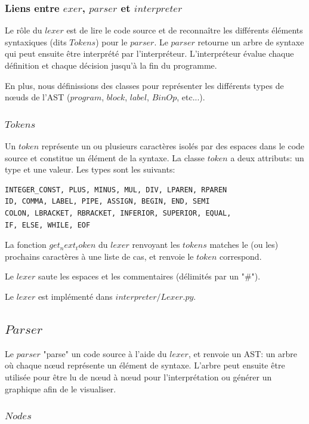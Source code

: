 \documentclass[a4paper]{article}
\begin{document}
\subsubsection{Liens entre $exer$, $parser$ et $interpreter$}

Le rôle du $lexer$ est de lire le code source et de reconnaître les différents éléments syntaxiques (dits $Tokens$) pour le $parser$. Le $parser$ retourne un arbre de syntaxe qui peut ensuite être interprété par l’interpréteur. L'interpréteur évalue chaque définition et chaque décision jusqu'à la fin du programme. 

En plus, nous définissions des classes pour représenter les différents types de nœuds de l'AST ($program$, $block$, $label$, $BinOp$, etc...). 

\subsubsection{$Tokens$}

Un $token$ représente un ou plusieurs caractères isolés par des espaces dans le code source et constitue un élément de la syntaxe. La classe $token$ a deux attributs: un type et une valeur. Les types sont les suivants: 
\begin{verbatim}
INTEGER_CONST, PLUS, MINUS, MUL, DIV, LPAREN, RPAREN      
ID, COMMA, LABEL, PIPE, ASSIGN, BEGIN, END, SEMI 
COLON, LBRACKET, RBRACKET, INFERIOR, SUPERIOR, EQUAL, 
IF, ELSE, WHILE, EOF
\end{verbatim}
La fonction $get_next_token$ du $lexer$ renvoyant les $tokens$ matches le (ou les) prochains caractères à une liste de cas, et renvoie le $token$ correspond. 

Le $lexer$ saute les espaces et les commentaires (délimités par un "\#"). 

Le $lexer$ est implémenté dans $interpreter/Lexer.py$. 

\subsection{$Parser$}

Le $parser$ "parse" un code source à l'aide du $lexer$, et renvoie un AST: un arbre où chaque nœud représente un élément de syntaxe. L'arbre peut ensuite être utilisée pour être lu de nœud à nœud pour l'interprétation ou générer un graphique afin de le visualiser.

\subsubsection{$Nodes$}
\end{document}
